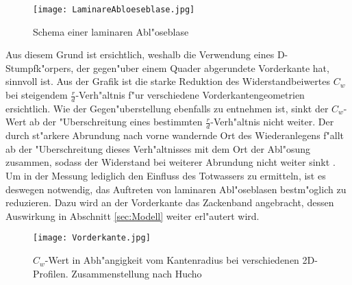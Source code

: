 \begin{figure}[h]
	\centering
	\texttt{[image: LaminareAbloeseblase.jpg]}
	\caption{Schema einer laminaren Abl"oseblase \cite{Siegman.2015}}
	\label{fig:LamBlase}
\end{figure}

Aus diesem Grund ist ersichtlich, weshalb die Verwendung eines D-Stumpfk"orpers, der gegen"uber einem Quader abgerundete  Vorderkante hat, sinnvoll ist. Aus der Grafik  ist die starke Reduktion des Widerstandbeiwertes $C_w$ bei steigendem $\frac{r}{d}$-Verh"altnis f"ur verschiedene Vorderkantengeometrien ersichtlich. Wie der Gegen"uberstellung  ebenfalls zu entnehmen ist, sinkt der $C_w$-Wert ab der "Uberschreitung eines bestimmten $\frac{r}{d}$-Verh"altnis nicht weiter. Der durch st"arkere Abrundung nach vorne wandernde Ort des Wiederanlegens f"allt ab der "Uberschreitung dieses Verh"altnisses mit dem Ort der Abl"osung zusammen, sodass der Widerstand bei weiterer Abrundung nicht weiter sinkt \cite{Hucho.2011}. 
Um in der Messung lediglich den Einfluss des Totwassers zu ermitteln, ist es deswegen notwendig, das Auftreten von laminaren Abl"oseblasen bestm"oglich zu reduzieren. Dazu wird an der Vorderkante das Zackenband angebracht, dessen Auswirkung in Abschnitt \ref{sec:Modell} weiter erl"autert wird.

\begin{figure}[h]
	\centering	\texttt{[image: Vorderkante.jpg]}
	\caption{$C_w$-Wert in Abh"angigkeit vom Kantenradius bei verschiedenen 2D-Profilen. Zusammenstellung nach Hucho\cite{Hucho.1972}}
	\label{fig:Vorderkante}
\end{figure}









